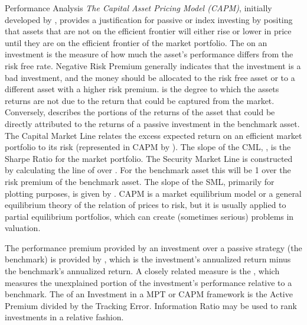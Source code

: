 \documentclass[12pt,letterpaper,english]{article}
\begin{document}
\begin{Section}{Performance Analysis}
\emph{The Capital Asset Pricing Model (CAPM)}, initially developed by \Cite{William Sharpe in 1964}, provides a justification for passive or index investing by positing that assets that are not on the efficient frontier will either rise or lower in price until they are on the efficient frontier of the market portfolio. The  on an investment is the measure of how much the asset's performance differs from the risk free rate.  Negative Risk Premium generally indicates that the investment is a bad investment, and the money should be allocated to the risk free asset or to a different asset with a higher risk premium.   is the degree to which the assets returns are not due to the return that could be captured from the market. Conversely,  describes the portions of the returns of the asset that could be directly attributed to the returns of a passive investment in the benchmark asset. The Capital Market Line  relates the excess expected return on an efficient market portfolio to its risk (represented in CAPM by  ).  The slope of the CML, , is the Sharpe Ratio for the market portfolio. The Security Market Line is constructed by calculating the line of  over .  For the benchmark asset this will be 1 over the risk premium of the benchmark asset. The slope of the SML, primarily for plotting purposes, is given by . CAPM is a market equilibrium model or a general equilibrium theory of the relation of prices to risk, but it is usually applied to partial equilibrium portfolios, which can create (sometimes serious) problems in valuation.

The performance premium provided by an investment over a passive strategy (the benchmark) is provided by , which is the investment's annualized return minus the benchmark's annualized return. A closely related measure is the , which  measures the unexplained portion of the investment's performance relative to a benchmark. The  of an Investment in a MPT or CAPM framework is the Active Premium divided by the Tracking Error.  Information Ratio may be used to rank investments in a relative fashion.


\end{Section}
\end{document}
